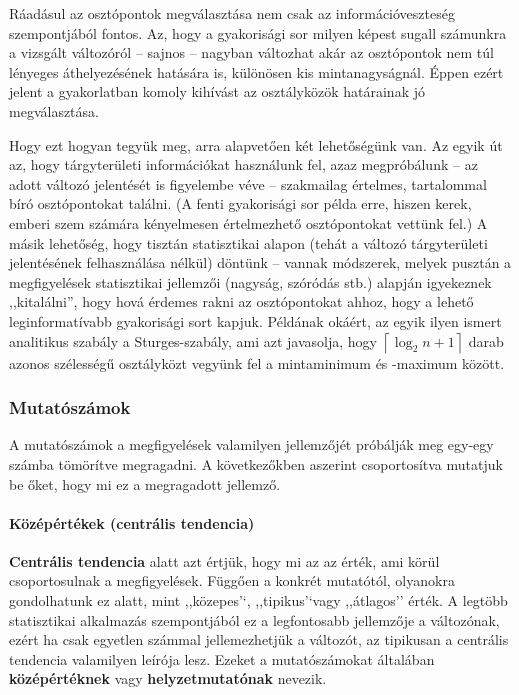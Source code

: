 \documentclass[]{book}
\let\oldparagraph\paragraph
\renewcommand{\paragraph}[1]{\oldparagraph{#1}\mbox{}}
\begin{document}
Ráadásul az osztópontok megválasztása nem csak az információveszteség
szempontjából fontos. Az, hogy a gyakorisági sor milyen képest sugall
számunkra a vizsgált változóról -- sajnos -- nagyban változhat akár az
osztópontok nem túl lényeges áthelyezésének hatására is, különösen kis
mintanagyságnál. Éppen ezért jelent a gyakorlatban komoly kihívást az
osztályközök határainak jó megválasztása.

Hogy ezt hogyan tegyük meg, arra alapvetően két lehetőségünk van. Az
egyik út az, hogy tárgyterületi információkat használunk fel, azaz
megpróbálunk -- az adott változó jelentését is figyelembe véve --
szakmailag értelmes, tartalommal bíró osztópontokat találni. (A fenti
gyakorisági sor példa erre, hiszen kerek, emberi szem számára
kényelmesen értelmezhető osztópontokat vettünk fel.) A másik lehetőség,
hogy tisztán statisztikai alapon (tehát a változó tárgyterületi
jelentésének felhasználása nélkül) döntünk -- vannak módszerek, melyek
pusztán a megfigyelések statisztikai jellemzői (nagyság, szóródás stb.)
alapján igyekeznek ,,kitalálni'', hogy hová érdemes rakni az
osztópontokat ahhoz, hogy a lehető leginformatívabb gyakorisági sort
kapjuk. Példának okáért, az egyik ilyen ismert analitikus szabály a
Sturges-szabály, ami azt javasolja, hogy
\(\left\lceil \log_2 n+1\right\rceil\) darab azonos szélességű
osztályközt vegyünk fel a mintaminimum és -maximum között.

\subsubsection{Mutatószámok}\label{deskriptivmennyegyvaltanalitikusmutatoszamok}

A mutatószámok a megfigyelések valamilyen jellemzőjét próbálják meg
egy-egy számba tömörítve megragadni. A következőkben aszerint
csoportosítva mutatjuk be őket, hogy mi ez a megragadott jellemző.

\paragraph{Középértékek (centrális
tendencia)}\label{deskriptivmennyegyvaltanalitikusmutatoszamokcentralistendencia}

\textbf{Centrális tendencia} alatt azt értjük, hogy mi az az érték, ami
körül csoportosulnak a megfigyelések. Függően a konkrét mutatótól,
olyanokra gondolhatunk ez alatt, mint ,,közepes'`, ,,tipikus'`vagy
,,átlagos'' érték. A legtöbb statisztikai alkalmazás szempontjából ez a
legfontosabb jellemzője a változónak, ezért ha csak egyetlen számmal
jellemezhetjük a változót, az tipikusan a centrális tendencia valamilyen
leírója lesz. Ezeket a mutatószámokat általában \textbf{középértéknek}
vagy \textbf{helyzetmutatónak} nevezik.
\end{document}
